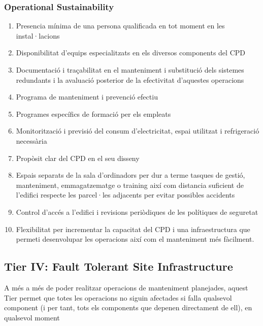 \documentclass[11pt,a4paper,titlepage]{article}
\begin{document}
    \subsubsection{Operational Sustainability}
    \begin{enumerate}[nolistsep, label=\alph*.]
    \item Presencia mínima de una persona qualificada en tot moment en les instal·lacions
    \item Disponibilitat d'equips especialitzats en els diversos components del CPD
    \item Documentació i traçabilitat en el manteniment i substitució dels sistemes redundants i la avaluació posterior de la efectivitat d'aquestes operacions
    \item Programa de manteniment i prevenció efectiu
    \item Programes específics de formació per els empleats
    \item Monitorització i previsió del consum d'electricitat, espai utilitzat i refrigeració necessària
    \item Propòsit clar del CPD en el seu disseny
    \item Espais separats de la sala d'ordinadors per dur a terme tasques de gestió, manteniment, emmagatzematge o training així com distancia suficient de l'edifici respecte les parcel·les adjacents per evitar possibles accidents
    \item Control d'accés a l'edifici i revisions periòdiques de les polítiques de seguretat
    \item Flexibilitat per incrementar la capacitat del CPD i una infraestructura que permeti desenvolupar les operacions així com el manteniment més fàcilment.
    \end{enumerate}
    
    
    
    \subsection{Tier IV: Fault Tolerant Site Infrastructure}
    A més a més de poder realitzar operacions de manteniment planejades, aquest Tier permet que totes les operacions no siguin afectades si falla qualsevol component (i per tant, tots els components que depenen directament de ell), en qualsevol moment
    
\end{document}
